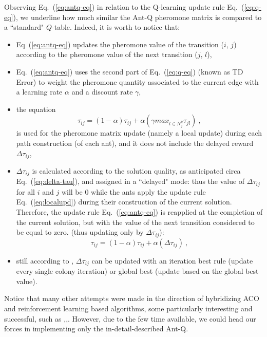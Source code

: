 \documentclass[10pt]{article}
\begin{document}
Observing Eq.~(\ref{eq:antq-eq}) in relation to the Q-learning update rule Eq.~(\ref{eq:q-eq}), we underline how much similar the Ant-Q pheromone matrix is compared to a ``standard" $Q$-table. Indeed, it is worth to notice that:
\begin{itemize}
\item  Eq~(\ref{eq:antq-eq})  updates the pheromone  value  of  the  transition  ($i$, $j$)  according to the  pheromone  value  of  the  next transition  ($j$, $ l$),
\item Eq.~(\ref{eq:antq-eq}) uses  the second part of Eq.~(\ref{eq:q-eq}) (known as TD Error) to  weight the  pheromone  quantity associated  to  the current  edge  with  a learning  rate $\alpha$  and  a discount  rate $\gamma$, 
\item the equation 
\begin{equation}
\tau_{ij}= (1-\alpha) \tau_{ij} + \alpha(\gamma max_{l\in N^k_j}\tau_{jl}) ~,
\label{eq:localupd}
\end{equation}
is used for the pheromone matrix update (namely a local update) during each path construction (of each ant), and it does not include the delayed reward $\Delta \tau_{ij}$,
\item $\Delta \tau_{ij}$ is calculated according to the solution quality, as anticipated circa Eq.~(\ref{eq:delta-tau}), and assigned in a ``delayed" mode: thus the value of $\Delta \tau_{ij}$  for all $i$ and $j$ will be $0$ while the ants  apply  the  update  rule Eq.~(\ref{eq:localupd})  during  their  construction  of the  current solution. 
Therefore, the update rule Eq.~(\ref{eq:antq-eq}) is reapplied at the completion of the current solution, but with the value of the next transition considered to be equal to zero. (thus updating only by $\Delta \tau_{ij}$):
\begin{equation}
\tau_{ij}= (1-\alpha) \tau_{ij} + \alpha(\Delta\tau_{ij}) ~,
\label{eq:antq-delay}
\end{equation}

\item still according to \cite{undici},\cite{diciotto} $\Delta \tau_{ij}$ can be updated with an iteration  best  rule (update every single colony iteration) or  global  best (update based on the global best value).
\end{itemize}

Notice that many other attempts were made in the direction of hybridizing ACO and reinforcement learning based algorithms, some particularly interesting and successful, such as \cite{sedici},\cite{quattordici},\cite{quindici}. However, due to the few time available, we could head our forces in implementing only the in-detail-described Ant-Q.
\end{document}
